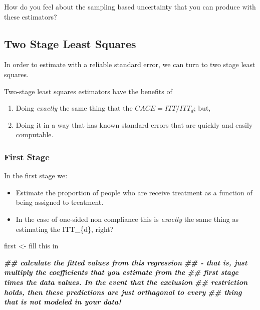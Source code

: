 \documentclass[
]{article}
\newenvironment{Shaded}{\begin{snugshade}}{\end{snugshade}}
\newcommand{\DocumentationTok}[1]{\textcolor[rgb]{0.56,0.35,0.01}{\textbf{\textit{#1}}}}
\newcommand{\NormalTok}[1]{#1}
\newcommand{\OtherTok}[1]{\textcolor[rgb]{0.56,0.35,0.01}{#1}}
\newcommand{\StringTok}[1]{\textcolor[rgb]{0.31,0.60,0.02}{#1}}
\providecommand{\tightlist}{%
  \setlength{\itemsep}{0pt}\setlength{\parskip}{0pt}}
\theoremstyle{definition}
\theoremstyle{definition}
\theoremstyle{definition}
\theoremstyle{definition}
\theoremstyle{remark}
\begin{document}
How do you feel about the sampling based uncertainty that you can produce with these estimators?

\subsection{Two Stage Least Squares}\label{two-stage-least-squares}

In order to estimate with a reliable standard error, we can turn to two stage least squares.

Two-stage least squares estimators have the benefits of

\begin{enumerate}
\def\labelenumi{\arabic{enumi}.}
\tightlist
\item
  Doing \emph{exactly} the same thing that the \(CACE = ITT / ITT_{d}\); but,
\item
  Doing it in a way that has known standard errors that are quickly and easily computable.
\end{enumerate}

\subsubsection{First Stage}\label{first-stage}

In the first stage we:

\begin{itemize}
\tightlist
\item
  Estimate the proportion of people who are receive treatment as a function of being assigned to treatment.
\item
  In the case of one-sided non compliance this is \emph{exactly} the same thing as estimating the
  ITT\_\{d\}, right?
\end{itemize}

\begin{Shaded}
\begin{Highlighting}[]
\NormalTok{first }\OtherTok{\textless{}{-}} \StringTok{\textquotesingle{}fill this in\textquotesingle{}}
\end{Highlighting}
\end{Shaded}

\begin{Shaded}
\begin{Highlighting}[]
\DocumentationTok{\#\# calculate the fitted values from this regression}
\DocumentationTok{\#\#   {-} that is, just multiply the coefficients that you estimate from the}
\DocumentationTok{\#\#     first stage times the data values. In the event that the exclusion}
\DocumentationTok{\#\#     restriction holds, then these predictions are just orthagonal to every}
\DocumentationTok{\#\#     thing that is not modeled in your data! }
\end{Highlighting}
\end{Shaded}
\end{document}
